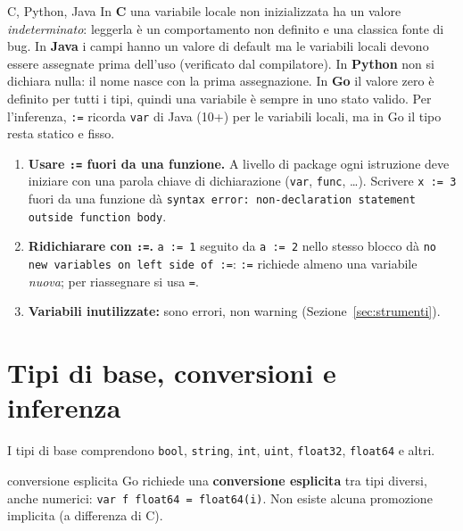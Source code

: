 \documentclass[11pt,a4paper]{report}
\newcommand{\cod}[1]{\texttt{#1}}
\begin{document}
\begin{confronto}{C, Python, Java}
In \textbf{C} una variabile locale non inizializzata ha un valore
\emph{indeterminato}: leggerla è un comportamento non definito e una classica
fonte di bug. In \textbf{Java} i campi hanno un valore di default ma le variabili
locali devono essere assegnate prima dell'uso (verificato dal compilatore). In
\textbf{Python} non si dichiara nulla: il nome nasce con la prima assegnazione.
In \textbf{Go} il valore zero è definito per tutti i tipi, quindi una variabile è
sempre in uno stato valido. Per l'inferenza, \cod{:=} ricorda \cod{var} di Java
(10+) per le variabili locali, ma in Go il tipo resta statico e fisso.
\end{confronto}

\begin{attenzione}[Errori comuni con \cod{:=} e \cod{var}]
\begin{enumerate}
  \item \textbf{Usare \cod{:=} fuori da una funzione.} A livello di package ogni
        istruzione deve iniziare con una parola chiave di dichiarazione
        (\cod{var}, \cod{func}, \ldots). Scrivere \cod{x := 3} fuori da una funzione
        dà \texttt{syntax error: non-declaration statement outside function body}.
  \item \textbf{Ridichiarare con \cod{:=}.} \cod{a := 1} seguito da \cod{a := 2}
        nello stesso blocco dà \texttt{no new variables on left side of :=}:
        \cod{:=} richiede almeno una variabile \emph{nuova}; per riassegnare si
        usa \cod{=}.
  \item \textbf{Variabili inutilizzate:} sono errori, non warning
        (Sezione~\ref{sec:strumenti}).
\end{enumerate}
\end{attenzione}

\section{Tipi di base, conversioni e inferenza}

I tipi di base comprendono \cod{bool}, \cod{string}, \cod{int}, \cod{uint},
\cod{float32}, \cod{float64} e altri.

\begin{definizione}{conversione esplicita}
Go richiede una \textbf{conversione esplicita} tra tipi diversi, anche
numerici: \cod{var f float64 = float64(i)}. Non esiste alcuna promozione
implicita (a differenza di C).
\end{definizione}
\end{document}
